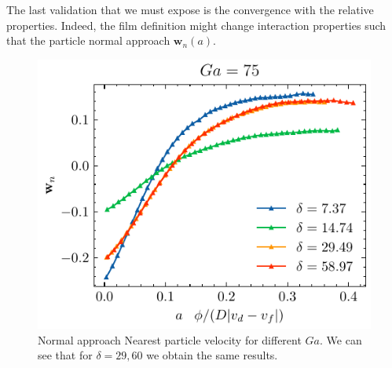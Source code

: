 The last validation that we must expose is the convergence with the relative properties. 
Indeed, the film definition might change interaction properties such that the particle normal approach $\textbf{w}_n(a)$. 
\begin{figure}[h!]
    \centering
    \includegraphics[height=0.3\textwidth]{image/VALIDATION2.0/Hnst/ur_a_ndc_35_Ga_75.pdf}
    \caption{Normal approach Nearest particle velocity for different $Ga$. 
    We can see that for $\delta = 29,60$ we obtain the same results.}
\end{figure}

